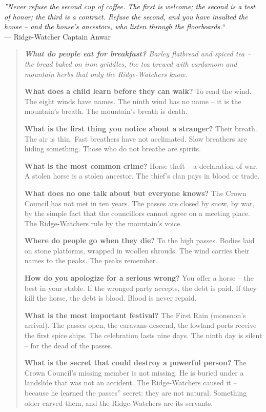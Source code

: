 \documentclass[12pt,oneside]{book}
\newenvironment{almanac}
  {\begin{quote}\small\itshape}
  {\end{quote}}
\begin{document}
\vspace{0.5em}
\noindent\textit{''Never refuse the second cup of coffee. The first is welcome; the second is a test of honor; the third is a contract. Refuse the second, and you have insulted the house -- and the house's ancestors, who listen through the floorboards.``} \\
--- Ridge-Watcher Captain Anwar

\vspace{1em}
\begin{almanac}
\textbf{What do people eat for breakfast?} Barley flatbread and spiced tea -- the bread baked on iron griddles, the tea brewed with cardamom and mountain herbs that only the Ridge-Watchers know.

\textbf{What does a child learn before they can walk?} To read the wind. The eight winds have names. The ninth wind has no name -- it is the mountain's breath. The mountain's breath is death.

\textbf{What is the first thing you notice about a stranger?} Their breath. The air is thin. Fast breathers have not acclimated. Slow breathers are hiding something. Those who do not breathe are spirits.

\textbf{What is the most common crime?} Horse theft -- a declaration of war. A stolen horse is a stolen ancestor. The thief's clan pays in blood or trade.

\textbf{What does no one talk about but everyone knows?} The Crown Council has not met in ten years. The passes are closed by snow, by war, by the simple fact that the councillors cannot agree on a meeting place. The Ridge-Watchers rule by the mountain's voice.

\textbf{Where do people go when they die?} To the high passes. Bodies laid on stone platforms, wrapped in woollen shrouds. The wind carries their names to the peaks. The peaks remember.

\textbf{How do you apologize for a serious wrong?} You offer a horse -- the best in your stable. If the wronged party accepts, the debt is paid. If they kill the horse, the debt is blood. Blood is never repaid.

\textbf{What is the most important festival?} The First Rain (monsoon's arrival). The passes open, the caravans descend, the lowland ports receive the first spice ships. The celebration lasts nine days. The ninth day is silent -- for the dead of the passes.

\textbf{What is the secret that could destroy a powerful person?} The Crown Council's missing member is not missing. He is buried under a landslide that was not an accident. The Ridge-Watchers caused it -- because he learned the passes'' secret: they are not natural. Something older carved them, and the Ridge-Watchers are its servants.
\end{almanac}
\end{document}
